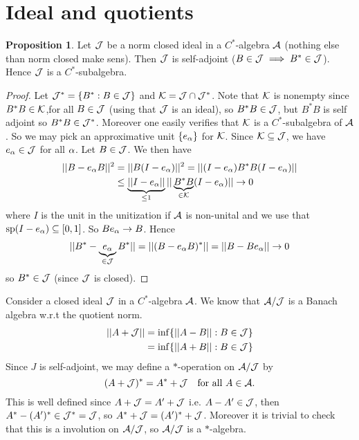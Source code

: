 \documentclass[10pt,english,a4paper]{article}
\theoremstyle{definition}
\newtheorem*{proposition}{Proposition}
\DeclareMathOperator{\Sp}{sp}
\begin{document}
\section{Ideal and quotients}
\begin{proposition}
    Let $\mathcal{J}$ be a norm closed ideal in a $C^*$-algebra $\mathcal{A}$ (nothing else than norm closed make sens). Then $\mathcal{J}$ is self-adjoint ($B \in \mathcal{J} \implies B^* \in \mathcal{J}$). 
Hence $\mathcal{J}$ is a $C^*$-subalgebra. 
\end{proposition}
\begin{proof}
    Let $\mathcal{J}^* = \{B^* : B \in \mathcal{J}\}$ and $\mathcal{K} = \mathcal{J}\cap \mathcal{J}^*$. Note that 
    $\mathcal{K}$ is nonempty since $B^*B \in \mathcal{K}$,for all $B\in \mathcal{J}$ (using that $\mathcal{J}$ is an ideal),
so $B^*B \in \mathcal{J}$, but $B^*B$ is self adjoint so $B^*B \in \mathcal{J}^*$.
Moreover one easily verifies that $\mathcal{K}$ is a $C^*$-subalgebra of $\mathcal{A}$.
So we may pick an approximative unit $\{e_{\alpha}\}$ for $\mathcal{K}$. Since 
$\mathcal{K} \subseteq \mathcal{J}$, we have $e_{\alpha} \in \mathcal{J}$ for all $\alpha$. Let 
$B \in \mathcal{J}$. We then have 
\begin{align*}
    ||B-e_{\alpha}B||^2 &=
    ||B(I-e_{\alpha})||^2 = ||(I-e_{\alpha}) B^*B (I - e_{\alpha})|| \\
    &\leq \underbrace{||I-e_{\alpha}||}_{\leq 1} ||\underbrace{B^*B}_{\in \mathcal{K}}(I-e_{\alpha})|| \to 0
\end{align*}
where $I$ is the unit in the unitization if $\mathcal{A}$ is non-unital and we use that 
$\Sp(I-e_{\al})\subseteq [0,1]$. So $Be_{\alpha} \to B$.
Hence
\begin{align*}
||B^* - \underbrace{e_{\alpha}}_{\in \mathcal{J}}B^* || = ||(B-e_{\alpha}B)^* ||   = ||B-Be_{\alpha}|| \to 0 
\end{align*}
so $B^* \in \mathcal{J}$ (since $\mathcal{J}$ is closed).
\end{proof}


Consider a closed ideal $\mathcal{J}$ in a $C^*$-algebra $\mathcal{A}$. We know that $\mathcal{A}/\mathcal{J}$
is a Banach algebra w.r.t the quotient norm.
\begin{align*}
    ||A+\mathcal{J}|| &= \inf\{ ||A-B|| : B\in \mathcal{J} \} \\
              &= \inf\{ ||A+B|| : B\in \mathcal{J} \}
\end{align*}
Since $J$ is self-adjoint, we may define a $*$-operation on $\mathcal{A}/\mathcal{J}$ by
\[ (A + \mathcal{J})^* = A^* + \mathcal{J} \quad \text{for all } A \in \mathcal{A}.\]
This is well defined since 
$A +\mathcal{J} = A' + \mathcal{J}$ i.e. $A-A' \in \mathcal{J}$, then 
$A^* - (A')^* \in \mathcal{J}^* = \mathcal{J}$, so $A^* + \mathcal{J} = (A')^* + \mathcal{J}$.
Moreover it is trivial to check that this is a involution on 
$\mathcal{A}/\mathcal{J}$, so $\mathcal{A}/\mathcal{J}$ is a $*$-algebra.
\end{document}
